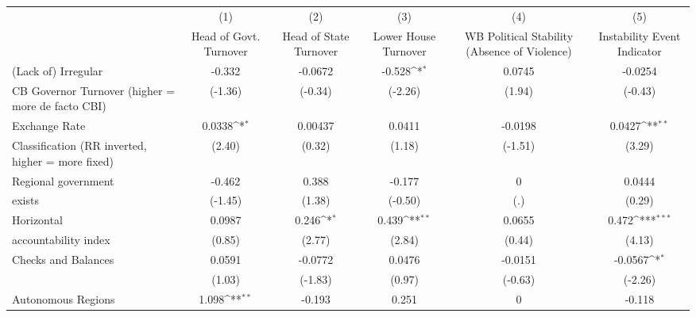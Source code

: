 {
\def\sym#1{\ifmmode^{#1}\else\(^{#1}\)\fi}
\begin{tabular}{l*{5}{c}}
\hline\hline
                    &\multicolumn{1}{c}{(1)}&\multicolumn{1}{c}{(2)}&\multicolumn{1}{c}{(3)}&\multicolumn{1}{c}{(4)}&\multicolumn{1}{c}{(5)}\\
                    &\multicolumn{1}{c}{Head of Govt. Turnover}&\multicolumn{1}{c}{Head of State Turnover}&\multicolumn{1}{c}{Lower House Turnover}&\multicolumn{1}{c}{WB Political Stability (Absence of Violence)}&\multicolumn{1}{c}{Instability Event Indicator}\\
\hline
(Lack of) Irregular &      -0.332         &     -0.0672         &      -0.528\sym{*}  &      0.0745         &     -0.0254         \\
CB Governor Turnover (higher = more de facto CBI)&     (-1.36)         &     (-0.34)         &     (-2.26)         &      (1.94)         &     (-0.43)         \\
[1em]
Exchange Rate       &      0.0338\sym{*}  &     0.00437         &      0.0411         &     -0.0198         &      0.0427\sym{**} \\
Classification (RR inverted, higher = more fixed)&      (2.40)         &      (0.32)         &      (1.18)         &     (-1.51)         &      (3.29)         \\
[1em]
Regional government &      -0.462         &       0.388         &      -0.177         &           0         &      0.0444         \\
exists              &     (-1.45)         &      (1.38)         &     (-0.50)         &         (.)         &      (0.29)         \\
[1em]
Horizontal          &      0.0987         &       0.246\sym{*}  &       0.439\sym{**} &      0.0655         &       0.472\sym{***}\\
accountability index&      (0.85)         &      (2.77)         &      (2.84)         &      (0.44)         &      (4.13)         \\
[1em]
Checks and Balances &      0.0591         &     -0.0772         &      0.0476         &     -0.0151         &     -0.0567\sym{*}  \\
                    &      (1.03)         &     (-1.83)         &      (0.97)         &     (-0.63)         &     (-2.26)         \\
[1em]
Autonomous Regions  &       1.098\sym{**} &      -0.193         &       0.251         &           0         &      -0.118         \\

\end{tabular}}
